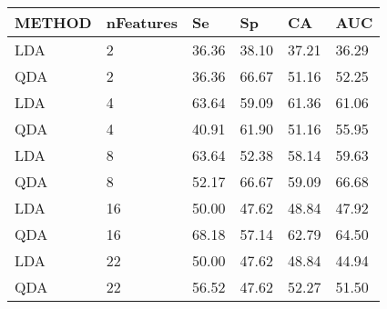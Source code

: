\begin{table}[!ht]
    \centering
    \begin{tabular}{llllll}
    \hline
        METHOD & nFeatures & Se & Sp & CA & AUC \\ \hline
        LDA & 2 & 36.36 & 38.10 & 37.21 & 36.29 \\ 
        QDA & 2 & 36.36 & 66.67 & 51.16 & 52.25 \\ 
        LDA & 4 & 63.64 & 59.09 & 61.36 & 61.06 \\ 
        QDA & 4 & 40.91 & 61.90 & 51.16 & 55.95 \\ 
        LDA & 8 & 63.64 & 52.38 & 58.14 & 59.63 \\ 
        QDA & 8 & 52.17 & 66.67 & 59.09 & 66.68 \\ 
        LDA & 16 & 50.00 & 47.62 & 48.84 & 47.92 \\ 
        QDA & 16 & 68.18 & 57.14 & 62.79 & 64.50 \\ 
        LDA & 22 & 50.00 & 47.62 & 48.84 & 44.94 \\ 
        QDA & 22 & 56.52 & 47.62 & 52.27 & 51.50 \\ 
    \end{tabular}
\end{table}